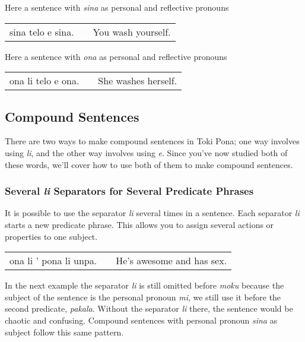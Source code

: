 Here a sentence with \textit{sina} as personal and reflective pronouns

\begin{supertabular}{p{5,5cm}|ll}
    sina telo e sina. &  & You wash yourself. \\
\end{supertabular}

Here a sentence with \textit{ona} as personal and reflective pronouns

\begin{supertabular}{p{5,5cm}|ll}
    ona li telo e ona. &  & She washes herself. \\
\end{supertabular}

\subsection*{Compound Sentences}
%
%
There are two ways to make compound sentences in Toki Pona; one way involves using \textit{li}, and the other way involves using \textit{e}.
Since you've now studied both of these words, we'll cover how to use both of them to make compound sentences.

\label{'multiple_li'}
\subsubsection*{Several \textit{li} Separators for Several Predicate Phrases}
%
%

It is possible to use the separator \textit{li} several times in a sentence.
Each separator \textit{li} starts a new predicate phrase.
This allows you to assign several actions or properties to one subject.

\begin{supertabular}{p{5,5cm}|ll}
    ona li ' pona li unpa. &  & He's awesome and has sex. \\
\end{supertabular}

In the next example the separator \textit{li} is still omitted before \textit{moku} because the subject of the sentence is the personal pronoun \textit{mi}, we still use it before the second predicate, \textit{pakala}.
Without the separator \textit{li} there, the sentence would be chaotic and confusing.
Compound sentences with personal pronoun \textit{sina} as subject follow this same pattern.

